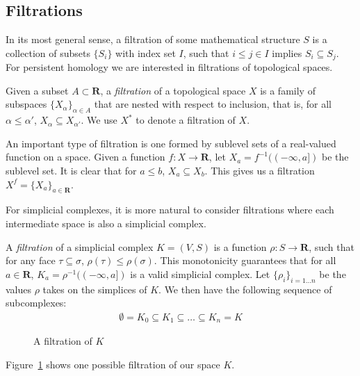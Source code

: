 \subsection{Filtrations}

In its most general sense, a filtration of some mathematical structure $S$ is a collection of subsets $\{S_i\}$ with index set $I$, such that $i \leq j \in I$ implies $S_i \subseteq S_j$. For persistent homology we are interested in filtrations of topological spaces. 

\begin{definition}
Given a subset $A \subset \mathbf{R}$, a \emph{filtration} of a topological space $X$ is a family of subspaces $\{X_\alpha\}_{\alpha \in A}$ that are nested with respect to inclusion, that is, for all $\alpha \leq \alpha'$, $X_\alpha \subseteq X_{\alpha'}$. We use $X^*$ to denote a filtration of $X$.
\end{definition}

An important type of filtration is one formed by sublevel sets of a real-valued function on a space. Given a function $f : X \to \mathbf{R}$, let $X_a = f^{-1}((-\infty, a])$ be the sublevel set. It is clear that for $a \leq b$, $X_a \subseteq X_b$. This gives us a filtration $X^f = \{ X_a \}_{a \in \mathbf{R}}$.

For simplicial complexes, it is more natural to consider filtrations where each intermediate space is also a simplicial complex.

\begin{definition}
A \emph{filtration} of a simplicial complex $K = (V, S)$ is a function $\rho : S \to \mathbf{R}$, such that for any face $\tau \subseteq \sigma$, $\rho(\tau) \leq \rho(\sigma)$. This monotonicity guarantees that for all $a \in \mathbf{R}$, $K_a = \rho^{-1}((-\infty, a])$ is a valid simplicial complex. Let $\{\rho_i\}_{i = 1 \dots n}$ be the values $\rho$ takes on the simplices of $K$. We then have the following sequence of subcomplexes:
\begin{align*}
\emptyset = K_0 \subseteq K_1 \subseteq \dots \subseteq K_n = K
\end{align*}
\end{definition}

\begin{figure}
\makebox[\linewidth]{

}
\caption{A filtration of $K$}
\label{fig:filtration}
\end{figure}

\begin{example}
Figure~\ref{fig:filtration} shows one possible filtration of our space $K$.
\end{example}

